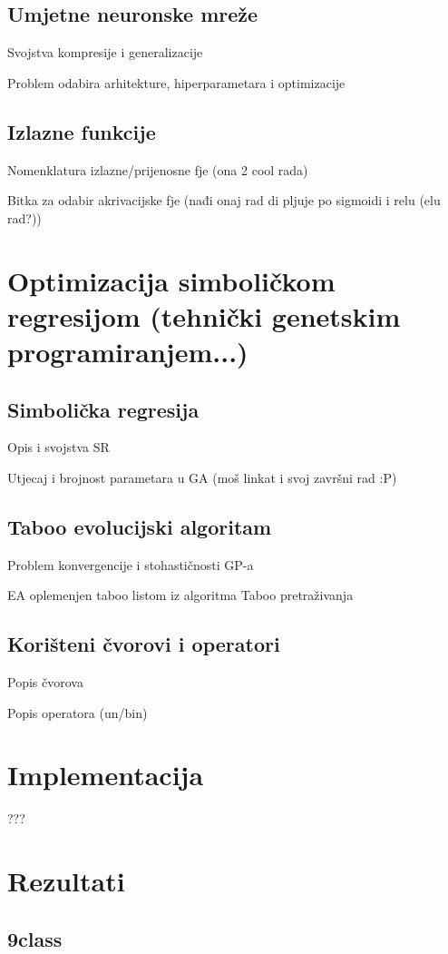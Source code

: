 \documentclass[times, utf8, diplomski]{fer}
\begin{document}
\section{Umjetne neuronske mreže}
Svojstva kompresije i generalizacije

Problem odabira arhitekture, hiperparametara i optimizacije

\section{Izlazne funkcije}
Nomenklatura izlazne/prijenosne fje (ona 2 cool rada)

Bitka za odabir akrivacijske fje (nađi onaj rad di pljuje po sigmoidi i relu (elu rad?))

\chapter{Optimizacija simboličkom regresijom (tehnički genetskim programiranjem...)}

\section{Simbolička regresija}
Opis i svojstva SR

Utjecaj i brojnost parametara u GA (moš linkat i svoj završni rad :P)

\section{Taboo evolucijski algoritam}
Problem konvergencije i stohastičnosti GP-a

EA oplemenjen taboo listom iz algoritma Taboo pretraživanja

\section{Korišteni čvorovi i operatori}
Popis čvorova

Popis operatora (un/bin)

\chapter{Implementacija}
???

\chapter{Rezultati}

\section{9class}
\end{document}
